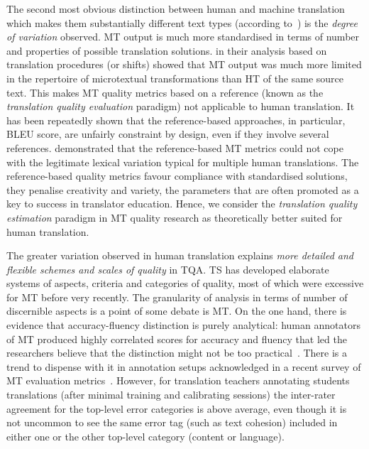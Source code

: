 The second most obvious distinction between human and machine translation which makes them substantially different text types (according to~\citet{Specia2018a}) is the \textit{degree of variation} observed. MT output is much more standardised in terms of number and properties of possible translation solutions. \citet{Ahrenberg2017} in their analysis based on translation procedures (or shifts) showed that MT output was much more limited in the repertoire of microtextual transformations than HT of the same source text.
This makes MT quality metrics based on a reference (known as the \textit{translation quality evaluation} paradigm) not applicable to human translation. It has been repeatedly shown that the reference-based approaches, in particular, BLEU score, are unfairly constraint by design, even if they involve several references. \citet{Vela2014} demonstrated that the reference-based MT metrics could not cope with the legitimate lexical variation typical for multiple human translations. The reference-based quality metrics favour compliance with standardised solutions, they penalise creativity and variety, the parameters that are often promoted as a key to success in translator education. Hence, we consider the \textit{translation quality estimation} paradigm in MT quality research as theoretically better suited for human translation.

The greater variation observed in human translation explains \textit{more detailed and flexible schemes and scales of quality} in TQA. TS has developed elaborate systems of aspects, criteria and categories of quality, most of which were excessive for MT before very recently. 
The granularity of analysis in terms of number of discernible aspects is a point of some debate is MT. On the one hand, there is evidence that accuracy-fluency distinction is purely analytical: human annotators of MT produced highly correlated scores for accuracy and fluency that led the researchers believe that the distinction might not be too practical~\cite{CallisonBurch2007}. There is a trend to dispense with it in annotation setups acknowledged in a recent survey of MT evaluation metrics~\cite{Chatzikoumi2020}.
However, for translation teachers annotating students translations (after minimal training and calibrating sessions) the inter-rater agreement for the top-level error categories is above average, even though it is not uncommon to see the same error tag (such as text cohesion) included in either one or the other top-level category (content or language).

